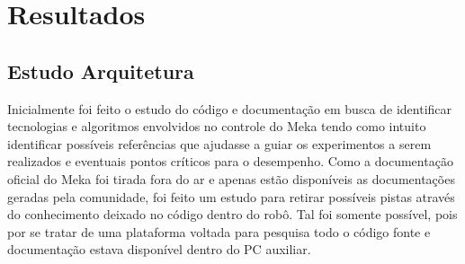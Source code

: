 \chapter{Resultados\label{ch:results}}







\section{Estudo Arquitetura}

Inicialmente foi feito o estudo do código e documentação em busca de identificar tecnologias e algoritmos envolvidos no controle do Meka tendo como intuito identificar possíveis referências que ajudasse a guiar os experimentos a serem realizados e eventuais pontos críticos para o desempenho. Como a documentação oficial do Meka foi tirada fora do ar e apenas estão disponíveis as documentações geradas pela comunidade, foi feito um estudo para retirar possíveis pistas através do conhecimento deixado no código dentro do robô. Tal foi somente possível, pois por se tratar de uma plataforma voltada para pesquisa todo o código fonte e documentação estava disponível dentro do PC auxiliar.

